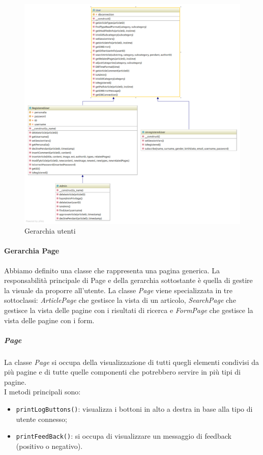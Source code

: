 \begin{figure}[H]
	\begin{center}
		\includegraphics[width=14cm]{img/User.png}
		\caption{Gerarchia utenti}
	\end{center}
\end{figure}

\paragraph{Gerarchia Page} Abbiamo definito una classe che rappresenta una pagina generica. La responsabilità principale di Page e della gerarchia sottostante è quella di gestire la visuale da proporre all'utente. La classe \textit{Page} viene specializzata in tre sottoclassi: \textit{ArticlePage} che gestisce la vista di un articolo, \textit{SearchPage} che gestisce la vista delle pagine con i risultati di ricerca e \textit{FormPage} che gestisce la vista delle pagine con i form.

\subparagraph{Page}
La classe \textit{Page} si occupa della visualizzazione di tutti quegli elementi condivisi da più pagine e di tutte quelle componenti che potrebbero servire in più tipi di pagine.\\
I metodi principali sono:
\begin{itemize}
	\item \texttt{printLogButtons()}: visualizza i bottoni in alto a destra in base alla tipo di utente connesso;
	\item \texttt{printFeedBack()}: si occupa di visualizzare un messaggio di feedback (positivo o negativo).
\end{itemize}

